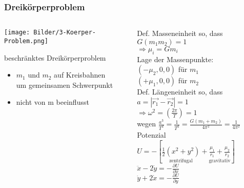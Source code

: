 \documentclass{beamer}
\begin{document}
\begin{frame}\frametitle{Dreikörperproblem}

\begin{columns}

\begin{column}{.48\textwidth}

\texttt{[image: Bilder/3-Koerper-Problem.png]}

\begin{block}{beschränktes Dreikörperproblem}

\tiny

\begin{itemize}
\item $m_1$ und $m_2$ auf Kreisbahnen\\ um gemeinsamen Schwerpunkt\\
\item nicht von m beeinflusst 
\end{itemize}

\end{block}

\end{column}

\hfill

\begin{column}{.48\textwidth}

\tiny

Def. Masseneinheit so, dass $G(m_1 m_2) = 1$\\
$\Rightarrow \mu_i = G m_i$\\[.3cm]

Lage der Massenpunkte:\\
$(-\mu_2,0,0)$ für $m_1$\\
$(+\mu_1,0,0)$ für $m_2$\\[.3cm]

Def. Längeneinheit so, dass $a = |\vec{r_1} - \vec{r_2}| = 1$\\
$\Rightarrow \omega^2 = (\frac{2\pi}{T}) = 1$\\
wegen $\frac{a^3}{T^2} = \frac{1}{T^2} = \frac{G(m_1 + m_2)}{4\pi^2} = \frac{1}{4\pi^2}$\\[.5cm]

Potenzial $U = - [\underset{\text{zentrifugal}}{\frac{1}{2}(x^2 + y^2)} + \underset{\text{gravitativ}}{\frac{\mu_1}{r_1} + \frac{\mu_2}{r_2}}]$\\

$\ddot{x} - 2\dot{y} = -\frac{\partial U}{\partial x}$\\
$\ddot{y} + 2\dot{x} = -\frac{\partial U}{\partial y}$

\end{column}

\end{columns}

\end{frame}
\end{document}
